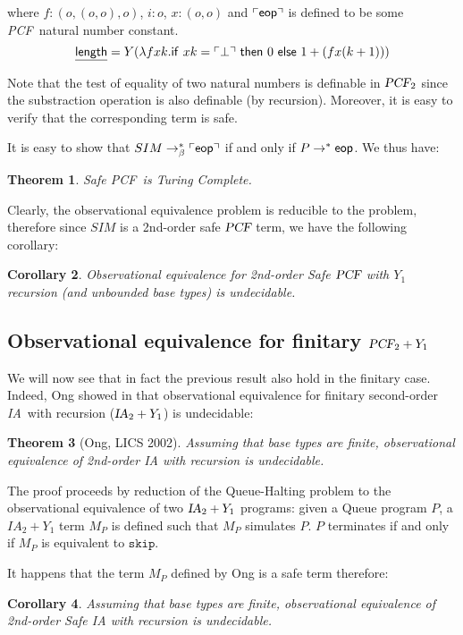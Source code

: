 \documentclass{article}
\newtheorem{theorem}{Theorem}[section]
\newtheorem{corollary}[theorem]{Corollary}
\newcommand{\encode}[1]{\ulcorner #1 \urcorner}
\newcommand\eop{{\sf eop}}
\newcommand{\betared}{\rightarrow_\beta}
\newcommand\ialgol{{\textsl{IA}}}
\newcommand\pcf{\textsl{PCF}}
\newcommand\iaskip{\texttt{skip}}
\begin{document}
where $f: (o,(o,o),o)$, $i:o$, $x:(o,o)$ and $\encode{\eop}$ is defined to be some \pcf\ natural number constant.
$$ \underline{\sf  length}  = Y( \lambda f x k . {\sf if\ } x k = \encode{\bot} {\sf\ then\ } 0 {\sf\ else\ } 1 + (f x (k+1)))$$

Note that the test of equality of two natural numbers is definable in $\pcf_2$ since the substraction operation is  also definable (by recursion). Moreover, it is easy to verify that the corresponding term is safe.

It is easy to show that $SIM \betared^* \encode{\eop}$ if and only if $P \rightarrow^* \eop$. We thus have:
\begin{theorem}
  Safe \pcf\ is Turing Complete.
\end{theorem}

Clearly, the observational equivalence problem is reducible to the  problem, therefore since $SIM$ is a 2nd-order safe $\pcf$ term, we have the following corollary:
\begin{corollary}
Observational equivalence for 2nd-order Safe $\pcf$ with $Y_1$ recursion (and unbounded base types) is undecidable.
\end{corollary}

\subsection{Observational equivalence for finitary $\pcf_2 + Y_1$}

We will now see that in fact the previous result also hold in the
finitary case. Indeed, Ong showed in \cite{Ong02} that
observational equivalence for finitary second-order \ialgol\ with
recursion ($\ialgol_2 + Y_1$) is undecidable:
\begin{theorem}[Ong, LICS 2002]
Assuming that base types are finite, observational equivalence of 2nd-order IA with recursion is undecidable.
\end{theorem}

The proof proceeds by reduction of the Queue-Halting problem to the
observational equivalence of two $\ialgol_2 + Y_1$ programs: given a
Queue program $P$, a $IA_2 + Y_1$ term $M_P$ is defined such that
$M_P$ simulates $P$. $P$ terminates if and only if $M_P$ is
equivalent to $\iaskip$.

It happens that the term $M_P$ defined by Ong is a safe term
therefore:
\begin{corollary}
Assuming that base types are finite, observational equivalence of 2nd-order Safe IA with recursion is undecidable.
\end{corollary}
\end{document}
